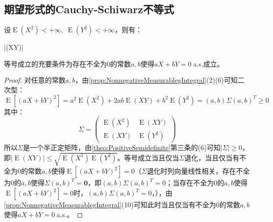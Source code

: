 \subsection{期望形式的Cauchy-Schiwarz不等式}
\begin{theorem}
	设$\operatorname{E}(X^2)<+\infty,\;\operatorname{E}(Y^2)<+\infty$，则有：
	\begin{inequality*}\label{ineq:cauchy-schiwarz-expectations}
		|(XY)|\leqslant{}
	\end{inequality*}
	等号成立的充要条件为存在不全为$0$的常数$a,b$使得$aX+bY=0\;$a.s.成立。
\end{theorem}
\begin{proof}
	对任意的常数$a,b$，由\cref{prop:NonnegativeMeasurablegIntegral}(2)(6)可知二次型：
	\begin{equation*}
		\operatorname{E}[(aX+bY)^2]=a^2\operatorname{E}(X^2)+2ab\operatorname{E}(XY)+b^2\operatorname{E}(Y^2)=(a,b)\Sigma(a,b)^T\geqslant0
	\end{equation*}
	其中：
	\begin{equation*}
		\Sigma=
		\begin{pmatrix}
			\operatorname{E}(X^2) & \operatorname{E}(XY) \\
			\operatorname{E}(XY) & \operatorname{E}(Y^2)
		\end{pmatrix}
	\end{equation*}
	所以$\Sigma$是一个半正定矩阵，由\cref{theo:PositiveSemidefinite}第三条的(6)可知$|\Sigma|\geqslant0$，即$|\operatorname{E}(XY)|\leqslant\sqrt{\operatorname{E}(X^2)\operatorname{E}(Y^2)}$。等号成立当且仅当$\Sigma$退化，当且仅当有不全为$0$的常数$a,b$使得$\operatorname{E}[(aX+bY)^2]=0$（$\Sigma$退化时列向量线性相关，存在不全为$0$的$a,b$使得$\Sigma(a,b)^T=\mathbf{0}$，即$(a,b)\Sigma(a,b)^T=0$；当存在不全为$0$的$a,b$使得$\operatorname{E}[(aX+bY)^2]=0$时，$(a,b)\Sigma(a,b)^T=0$，），由\cref{prop:NonnegativeMeasurablegIntegral}(10)可知此时当且仅当有不全为$0$的常数$a,b$使得$aX+bY=0\;$a.s.。
\end{proof}